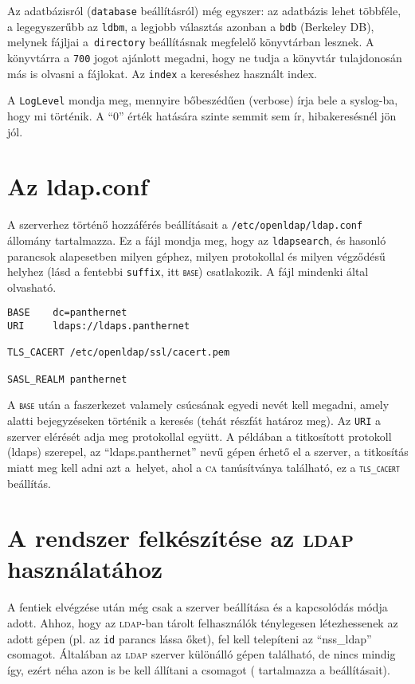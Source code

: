 Az adatbázisról (\texttt{database} beállításról) még egyszer: az adatbázis lehet többféle, a legegyszerűbb az
\texttt{ldbm}, a legjobb választás azonban a  \texttt{bdb} (Berkeley DB), melynek fájljai a~\texttt{directory}
beállításnak megfelelő könyvtárban lesznek. A könyvtárra a \texttt{700} jogot ajánlott megadni, hogy ne tudja a
könyvtár tulajdonosán más is olvasni a fájlokat. Az  \texttt{index} a  kereséshez használt index.

A \texttt{LogLevel} mondja meg, mennyire bőbeszédűen (verbose) írja bele a syslog-ba, hogy mi történik. A ``0'' érték
hatására szinte semmit sem ír, hibakeresésnél jön jól.

\section{Az ldap.conf}
A szerverhez történő hozzáférés beállításait a \texttt{/etc/openldap/ldap.conf} állomány tartalmazza.
Ez a fájl mondja meg, hogy az \texttt{ldapsearch}, és hasonló parancsok alapesetben milyen géphez, milyen protokollal
és milyen végződésű helyhez (lásd a fentebbi \texttt{suffix}, itt \texttt{\textsc{base}}) csatlakozik. A fájl mindenki által
olvasható.

\begin{Verbatim}[frame=single,label=ldap.conf]
BASE    dc=panthernet
URI     ldaps://ldaps.panthernet

TLS_CACERT /etc/openldap/ssl/cacert.pem

SASL_REALM panthernet
\end{Verbatim}


A \texttt{\textsc{base}} után a faszerkezet valamely csúcsának egyedi nevét kell megadni, amely alatti bejegyzéseken történik a
keresés (tehát részfát határoz meg). Az \texttt{URI} a szerver elérését adja meg protokollal együtt. A példában
a titkosított protokoll (ldaps) szerepel, az ``ldaps.panthernet'' nevű gépen érhető el a szerver, a titkosítás miatt meg
kell adni azt a~helyet, ahol a \textsc{ca} tanúsítványa található, ez a \texttt{\textsc{tls}\_\textsc{cacert}} beállítás.

\section{A rendszer felkészítése az \textsc{ldap} használatához}
A fentiek elvégzése után még csak a szerver beállítása és a kapcsolódás módja adott. Ahhoz, hogy az \textsc{ldap}-ban tárolt
felhasználók ténylegesen létezhessenek az adott gépen (pl. az \texttt{id} parancs lássa őket), fel kell telepíteni 
az ``nss\_ldap'' csomagot. Általában az \textsc{ldap}
szerver különálló gépen található, de nincs mindig így, ezért néha azon is be kell állítani a csomagot
( tartalmazza a beállításait).

